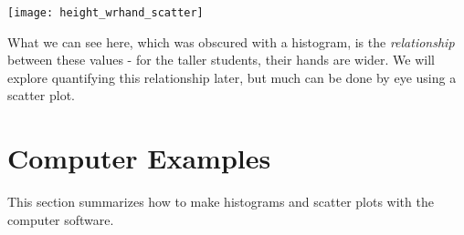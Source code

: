 \texttt{[image: height\_wrhand\_scatter]}

What we can see here, which was obscured with a histogram, is the {\em relationship} between these values - for the taller students, their hands are wider. We will explore quantifying this relationship later, but much can be done by eye using a scatter plot.


\section{Computer Examples}

This section summarizes how to make histograms and scatter plots with the computer software.

\begin{fullwidth}

\end{fullwidth}


